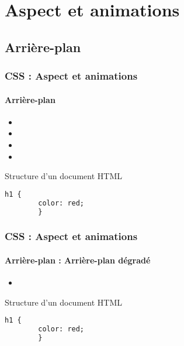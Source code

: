 \documentclass[xcolor=table]{beamer}
\begin{document}
\section{Aspect et animations}

\subsection{Arrière-plan}

\begin{frame}[fragile]
\frametitle{CSS : Aspect et animations}
\framesubtitle{Arrière-plan}

\begin{minipage}{0.60\textwidth}
	\begin{itemize}
		\item {}
		\item {}
		\item {}
		\item {}
	\end{itemize}
\end{minipage}
%
\begin{minipage}{0.38\textwidth}
	\begin{exampleblock}{Structure d'un document HTML}
		\lstset{escapeinside=**}
		\scriptsize\bfseries
		\begin{lstlisting}[language={html}]
		h1 {
		color: red;
		}
		\end{lstlisting}
	\end{exampleblock}
\end{minipage}
\end{frame}

\begin{frame}[fragile]
\frametitle{CSS : Aspect et animations}
\framesubtitle{Arrière-plan : Arrière-plan dégradé}

\begin{minipage}{0.60\textwidth}
	\begin{itemize}
		\item 
	\end{itemize}
\end{minipage}
%
\begin{minipage}{0.38\textwidth}
	\begin{exampleblock}{Structure d'un document HTML}
		\lstset{escapeinside=**}
		\scriptsize\bfseries
		\begin{lstlisting}[language={html}]
		h1 {
		color: red;
		}
		\end{lstlisting}
	\end{exampleblock}
\end{minipage}
\end{frame}
\end{document}
